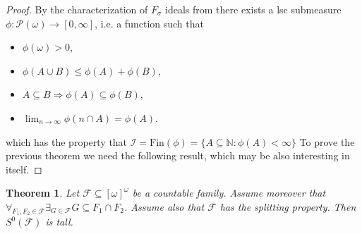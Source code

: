 \documentclass{amsart}
\newtheorem{thm}{Theorem}
\theoremstyle{definition}
\theoremstyle{definition}
\newcommand{\N}{{\mathbb N}}
\newcommand{\Fin}{\textrm{Fin}}
\newcommand{\I}{\mathcal I}
\begin{document}
\begin{proof}
By the characterization of $F_\sigma$ ideals from \cite{Maz} there exists a lsc submeasure 
$\phi \colon \mathcal{P}(\omega) \to [0, \infty]$, i.e. a function such that
\begin{itemize}
\item $\phi(\omega)>0$,
\item $\phi(A\cup B) \leq \phi(A) + \phi(B)$,
\item $A\subseteq B \Rightarrow\phi(A)\subseteq \phi(B)$,
\item \label{continuity-condition} $\lim_{n\to\infty} \phi(n \cap A) = \phi(A)$.
\end{itemize}
which has the property that 
$\I= \Fin(\phi)=\{A\subseteq \N: \phi(A)<\infty\}$
To prove the previous theorem we need 
the following result, which may be also interesting in itself. 
\end{proof}

\begin{thm}
Let $\mathcal{F}\subseteq [\omega]^\omega$ be a countable family. Assume moreover that 
$\forall_{F_1, F_2 \in \mathcal{F}} \exists_{G \in \mathcal{F}} G \subseteq F_1 \cap F_2$.
Assume also that $\mathcal{F}$ has the splitting property. 
Then $S^0(\mathcal{F})$ is tall.
\end{thm}
\end{document}
